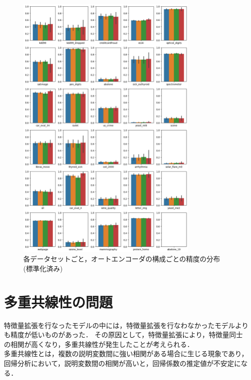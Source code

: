 \begin{figure}
    \centering
    \includegraphics[width=0.8\textwidth]{figures/result-dataset-std.png}
    \caption{各データセットごと，オートエンコーダの構成ごとの精度の分布(標準化済み)}
    \label{fig:compare-dataset-std}
\end{figure}

\section{多重共線性の問題}
特徴量拡張を行なったモデルの中には，特徴量拡張を行なわなかったモデルよりも精度が低いものがあった．
その原因として，特徴量拡張により，特徴量同士の相関が高くなり，多重共線性が発生したことが考えられる．\\
多重共線性とは，複数の説明変数間に強い相関がある場合に生じる現象であり，回帰分析において，説明変数間の相関が高いと，回帰係数の推定値が不安定になる．\\